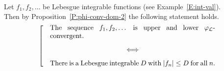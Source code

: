 \documentclass[main.tex]{subfiles}
\begin{document}
\begin{ex}
\label{E:seq-phi-conv}
Let $f_1,f_2,\dotsc$ be  Lebesgue integrable functions
(see Example~\ref{E:int-val}). \\
Then by Proposition~\ref{P:phi-conv-dom-2}
the following statement holds.
\begin{equation*}
\left[\quad
\begin{minipage}{.7\columnwidth}
 The sequence $f_1,f_2,\dotsc$
is  upper and lower $\Lphi$-convergent.
\begin{center}
$\Longleftrightarrow$
\end{center}
There is a Lebesgue integrable~$D$ with $|f_n| \leq D$ for all~$n$.
\end{minipage}
\right.
\end{equation*}
\end{ex}
\vspace{.3em}
\end{document}
